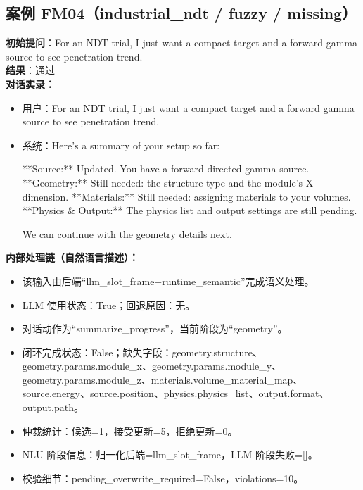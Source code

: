 \documentclass[11pt]{ctexart}
\begin{document}
\subsection{案例 FM04（industrial\_ndt / fuzzy / missing）}
\textbf{初始提问}：For an NDT trial, I just want a compact target and a forward gamma source to see penetration trend.\\
\textbf{结果}：通过\\
\textbf{对话实录：}
\begin{itemize}
\item 用户：For an NDT trial, I just want a compact target and a forward gamma source to see penetration trend.
\item 系统：Here's a summary of your setup so far:

**Source:** Updated. You have a forward-directed gamma source.
**Geometry:** Still needed: the structure type and the module's X dimension.
**Materials:** Still needed: assigning materials to your volumes.
**Physics \& Output:** The physics list and output settings are still pending.

We can continue with the geometry details next.
\end{itemize}
\textbf{内部处理链（自然语言描述）：}
\begin{itemize}
\item 该输入由后端“llm\_slot\_frame+runtime\_semantic”完成语义处理。
\item LLM 使用状态：True；回退原因：无。
\item 对话动作为“summarize\_progress”，当前阶段为“geometry”。
\item 闭环完成状态：False；缺失字段：geometry.structure、geometry.params.module\_x、geometry.params.module\_y、geometry.params.module\_z、materials.volume\_material\_map、source.energy、source.position、physics.physics\_list、output.format、output.path。
\item 仲裁统计：候选=1，接受更新=5，拒绝更新=0。
\item NLU 阶段信息：归一化后端=llm\_slot\_frame，LLM 阶段失败=[]。
\item 校验细节：pending\_overwrite\_required=False，violations=10。
\end{itemize}
\end{document}
